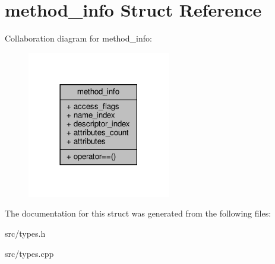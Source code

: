 \hypertarget{structmethod__info}{}\section{method\+\_\+info Struct Reference}
\label{structmethod__info}


Collaboration diagram for method\+\_\+info\+:
\nopagebreak
\begin{figure}[H]
\begin{center}
\leavevmode
\includegraphics[width=177pt]{structmethod__info__coll__graph}
\end{center}
\end{figure}


The documentation for this struct was generated from the following files\+:\begin{DoxyCompactItemize}
\item 
src/types.\+h\item 
src/types.\+cpp\end{DoxyCompactItemize}
